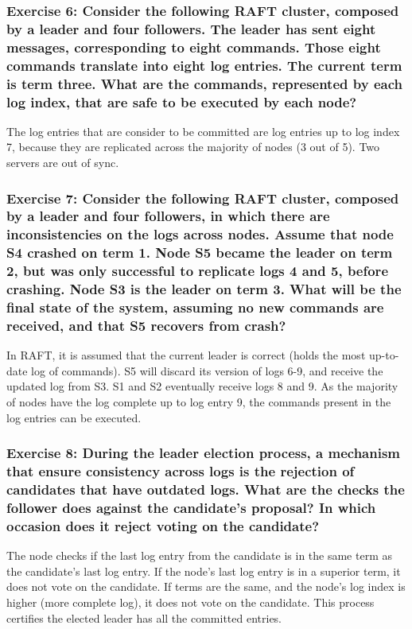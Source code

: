 \documentclass[12pt,a4paper]{article}
\begin{document}
\subsubsection*{Exercise 6: Consider the following RAFT cluster, composed by a leader and four followers. The leader has sent eight messages, corresponding to eight commands. Those eight commands translate into eight log entries. The current term is term three. What are the commands, represented by each log index, that are safe to be executed by each node?}

The log entries that are consider to be committed are log entries up to log index 7, because they are replicated across the majority of nodes (3 out of 5). Two servers are out of sync.

\subsubsection*{Exercise 7: Consider the following RAFT cluster, composed by a leader and four followers, in which there are inconsistencies on the logs across nodes. Assume that node S4 crashed on term 1. Node S5 became the leader on term 2, but was only successful to replicate logs 4 and 5, before crashing. Node S3 is the leader on term 3. What will be the final state of the system, assuming no new commands are received, and that S5 recovers from crash?} 

In RAFT, it is assumed that the current leader is correct (holds the most up-to-date log of commands). S5 will discard its version of logs 6-9, and receive the updated log from S3. S1 and S2 eventually receive logs 8 and 9. As the majority of nodes have the log complete up to log entry 9, the commands present in the log entries can be executed.

\subsubsection*{Exercise 8: During the leader election process, a mechanism that ensure consistency across logs is the rejection of candidates that have outdated logs. What are the checks the follower does against the candidate's proposal? In which occasion does it reject voting on the candidate?}

 The node checks if the last log entry from the candidate is in the same term as the candidate's last log entry. If the node's last log entry is in a superior term, it does not vote on the candidate. If terms are the same, and the node's log index is higher (more complete log), it does not vote on the candidate. This process certifies the elected leader has all the committed entries.
 
\end{document}
